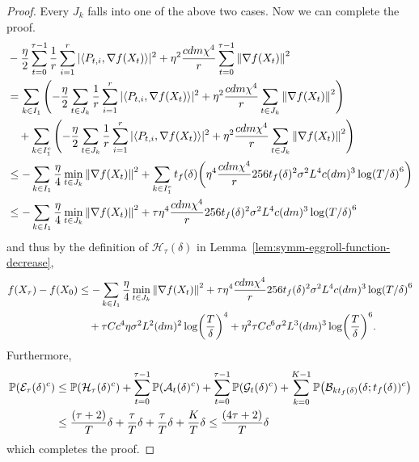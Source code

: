 \begin{proof}
    Every $J_k$ falls into one of the above two cases. Now we can complete the proof.
    \begin{align*}
        &-\frac{\eta}{2} \sum_{t=0}^{\tau-1} \frac 1r \sum_{i=1}^r |\langle P_{t,i}, \grad f(X_t) \rangle|^2 + \eta^2 \frac{cdm\chi^4}{r} \sum_{t=0}^{\tau-1} \mg{\grad f(X_t)}^2
        \\&= \sum_{k \in I_1} \qty(-\frac{\eta}{2} \sum_{t \in J_k} \frac 1r \sum_{i=1}^r |\langle P_{t,i}, \grad f(X_t) \rangle|^2 + \eta^2 \frac{cdm\chi^4}{r} \sum_{t \in J_k} \mg{\grad f(X_t)}^2)
        \\&\quad+\sum_{k \in I_1^c} \qty(-\frac{\eta}{2} \sum_{t \in J_k} \frac 1r \sum_{i=1}^r |\langle P_{t,i}, \grad f(X_t) \rangle|^2 + \eta^2 \frac{cdm\chi^4}{r} \sum_{t \in J_k} \mg{\grad f(X_t)}^2) \\
        &\leq -\sum_{k \in I_1} \frac{\eta}{4} \min_{t \in J_k} \mg{\grad f(X_t)}^2 + \sum_{k \in I_1^c} t_f(\delta) \qty(\eta^4 \frac{cdm\chi^4}{r} 256 t_f(\delta)^2 \sigma^2 L^4 c (dm)^3 \log(T/\delta)^6)
        \\&\leq -\sum_{k \in I_1} \frac{\eta}{4} \min_{t \in J_k} \mg{\grad f(X_t)}^2 + \tau  \eta^4 \frac{cdm\chi^4}{r} 256 t_f(\delta)^2 \sigma^2 L^4 c (dm)^3 \log(T/\delta)^6
    \end{align*}
    and thus by the definition of $\mathcal H_\tau(\delta)$ in Lemma~\ref{lem:symm-eggroll-function-decrease},
    \begin{align*}
        f(X_\tau) - f(X_0) &\leq  -\sum_{k \in I_1} \frac{\eta}{4} \min_{t \in J_k} \mg{\grad f(X_t)}^2 + \tau \eta^4 \frac{cdm\chi^4}{r} 256 t_f(\delta)^2 \sigma^2 L^4 c (dm)^3 \log(T/\delta)^6\\
        &\quad + \tau C c^4 \eta \sigma^2 L^2(dm)^2 \log(\frac T\delta)^4 + \eta^2 \tau C c^6  \sigma^2 L^3 (dm)^3 \log(\frac T \delta)^6.
    \end{align*}
    Furthermore,
    \begin{align*}
        \P(\mathcal E_\tau(\delta)^c) &\leq \P(\mathcal H_\tau(\delta)^c) + \sum_{t=0}^{\tau-1} \P(\mathcal A_t(\delta)^c) + \sum_{t=0}^{\tau-1} \P(\mathcal G_t(\delta)^c) + \sum_{k=0}^{K-1} \P(\mathcal B_{kt_f(\delta)}(\delta; t_f(\delta))^c) 
        \\&\leq \frac{(\tau+2)}{T}\delta + \frac{\tau}{T}\delta + \frac{\tau}{T}\delta + \frac{K}{T}\delta \leq \frac{(4\tau+2)}{T}\delta
    \end{align*}
    which completes the proof.
\end{proof}

